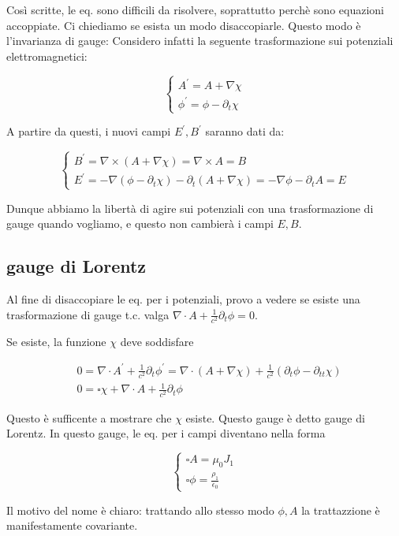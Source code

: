 \documentclass{report}
\begin{document}
Così scritte, le eq. sono difficili da risolvere, soprattutto perchè sono equazioni accoppiate. Ci chiediamo se esista un modo disaccopiarle. Questo modo è l'invarianza di gauge: Considero infatti la seguente trasformazione sui potenziali elettromagnetici: 

\[\begin{cases}
    A^{'} = A + \nabla\chi \\
    \phi^{'} = \phi - \partial_t\chi
\end{cases}\]

A partire da questi, i nuovi campi $E^{'}, B^{'}$ saranno dati da: 

\[\begin{cases}
    B^{'} = \nabla \times (A + \nabla \chi) = \nabla \times A = B \\
    E^{'} = -\nabla(\phi - \partial_t\chi) - \partial_t(A + \nabla\chi) = -\nabla \phi -\partial_tA = E
\end{cases}\]

Dunque abbiamo la libertà di agire sui potenziali con una trasformazione di gauge quando vogliamo, e questo non cambierà i campi $E, B$. 

\subsection{gauge di Lorentz}

Al fine di disaccopiare le eq. per i potenziali, provo a vedere se esiste una trasformazione di gauge t.c. valga $\nabla \cdot A + \frac{1}{c^2}\partial_t\phi =0$. 

Se esiste, la funzione $\chi$ deve soddisfare

\begin{align}   
    &0  = \nabla \cdot A^{'} + \frac{1}{c^2}\partial_t\phi^{'} = \nabla \cdot (A + \nabla \chi) + \frac{1}{c^2}(\partial_t\phi - \partial_{tt}\chi) \\
    &0 = \square\chi + \nabla\cdot A + \frac{1}{c^2}\partial_t\phi
\end{align}

Questo è sufficente a mostrare che $\chi$ esiste. Questo gauge è detto gauge di Lorentz. In questo gauge, le eq. per i campi diventano nella forma 

\[\begin{cases}
    \square A = \mu_0J_1 \\
    \square \phi = \frac{\rho_1}{\epsilon_0}
\end{cases}\]

Il motivo del nome è chiaro: trattando allo stesso modo $\phi, A$ la trattazzione è manifestamente covariante. \\
\end{document}
